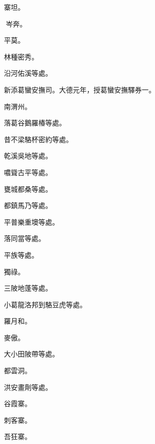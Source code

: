 \begin{pinyinscope}
 寨坦。



 岑奔。



 平莫。



 林種密秀。



 沿河佑溪等處。



 新添葛蠻安撫司。大德元年，授葛蠻安撫驛券一。



 南渭州。



 落葛谷鵝羅椿等處。



 昔不梁駱杯密約等處。



 乾溪吳地等處。



 噥聳古平等處。



 甕城都桑等處。



 都鎮馬乃等處。



 平普樂重墺等處。



 落同當等處。



 平族等處。



 獨祿。



 三陂地蓬等處。



 小葛龍洛邦到駱豆虎等處。



 羅月和。



 麥傲。



 大小田陂帶等處。



 都雲洞。



 洪安畫劑等處。



 谷霞寨。



 刺客寨。



 吾狂寨。




\end{pinyinscope}
